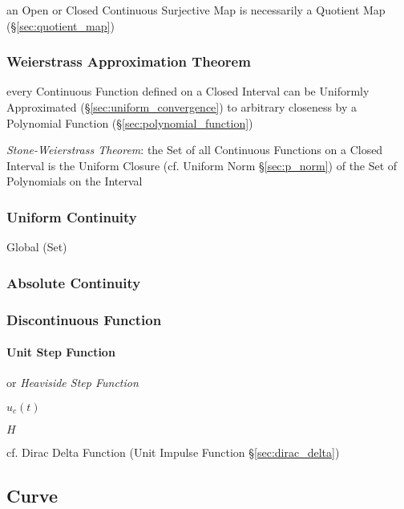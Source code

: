 an Open or Closed Continuous Surjective Map is necessarily a Quotient Map
(\S\ref{sec:quotient_map})



\subsubsection{Weierstrass Approximation Theorem}
\label{sec:weierstrass_approximation}

every Continuous Function defined on a Closed Interval can be Uniformly
Approximated (\S\ref{sec:uniform_convergence}) to arbitrary closeness by a
Polynomial Function (\S\ref{sec:polynomial_function})

\emph{Stone-Weierstrass Theorem}: the Set of all Continuous Functions on a
Closed Interval is the Uniform Closure (cf. Uniform Norm \S\ref{sec:p_norm}) of
the Set of Polynomials on the Interval



\subsubsection{Uniform Continuity}\label{sec:uniform_continuity}

Global (Set)



\subsubsection{Absolute Continuity}\label{sec:absolute_contunuity}

\subsubsection{Discontinuous Function}\label{sec:discontinuous_function}

\paragraph{Unit Step Function}\label{sec:unit_step_function}\hfill

or \emph{Heaviside Step Function}

$u_c(t)$

$H$

cf. Dirac Delta Function (Unit Impulse Function \S\ref{sec:dirac_delta})



\subsection{Curve}\label{sec:curve}

